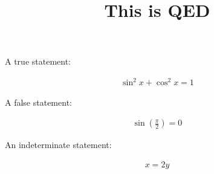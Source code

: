 \documentclass{article}
\title{This is QED}
\author{}
\date{}
\begin{document}
\maketitle

A true statement:

\begin{align}
    \sin^2 x + \cos^2 x = 1
\end{align}

A false statement:

\begin{align}
    \sin\left(\frac{\pi}{2}\right) = 0
\end{align}

An indeterminate statement:

\begin{align}
    x = 2 y
\end{align}
\end{document}
